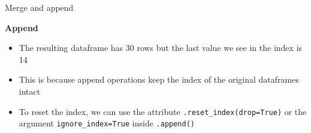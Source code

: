 \documentclass[aspectratio=169]{beamer}
\begin{document}
\begin{frame}{Merge and append}

	\textbf{Append}

	\begin{itemize}
		\item The resulting dataframe has 30 rows but the last value we see in the index is 14
		\item This is because append operations keep the index of the original dataframes intact
		\item To reset the index, we can use the attribute \texttt{.reset\_index(drop=True)} or the argument \texttt{ignore\_index=True} inside \texttt{.append()}
	\end{itemize}

\end{frame}
\end{document}
